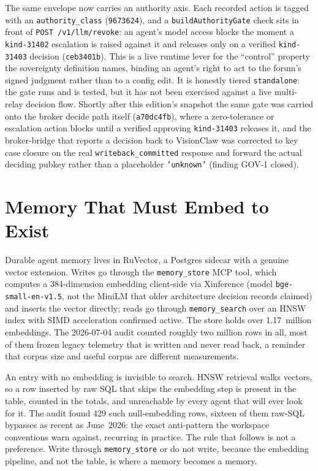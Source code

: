 The same envelope now carries an authority axis. Each recorded action is tagged with an \texttt{authority\_class} (\texttt{9673624}), and a
\texttt{buildAuthorityGate} check sits in front of \texttt{POST /v1/llm/revoke}: an agent's model access blocks the moment a \texttt{kind-31402} escalation is
raised against it and releases only on a verified \texttt{kind-31403} decision (\texttt{ceb3401b}). This is a live runtime lever for the ``control'' property the
sovereignty definition names, binding an agent's right to act to the forum's signed judgment rather than to a config edit. It is honestly tiered
\texttt{standalone}: the gate runs and is tested, but it has not been exercised against a live multi-relay decision flow. Shortly after this edition's
snapshot the same gate was carried onto the broker decide path itself (\texttt{a70dc4fb}), where a zero-tolerance or escalation action blocks until a verified
approving \texttt{kind-31403} releases it, and the broker-bridge that reports a decision back to VisionClaw was corrected to key case closure on the real
\texttt{writeback\_committed} response and forward the actual deciding pubkey rather than a placeholder \texttt{'unknown'} (finding GOV-1 closed).

\section{Memory That Must Embed to Exist}

Durable agent memory lives in RuVector, a Postgres sidecar with a genuine vector extension. Writes go through the \texttt{memory\_store} MCP tool, which
computes a 384-dimension embedding client-side via Xinference (model \texttt{bge-small-en-v1.5}, not the MiniLM that older architecture decision records
claimed) and inserts the vector directly; reads go through \texttt{memory\_search} over an HNSW index with SIMD acceleration confirmed active. The store holds
over 1.17~million embeddings. The 2026-07-04 audit counted roughly two million rows in all, most of them frozen legacy telemetry that is written and never read
back, a reminder that corpus size and useful corpus are different measurements.

\begin{keyinsight}[title={The pipeline is the contract}]
An entry with no embedding is invisible to search. HNSW retrieval walks vectors, so a row inserted by raw SQL that skips the embedding step is present in the
table, counted in the totals, and unreachable by every agent that will ever look for it. The audit found 429 such null-embedding rows, sixteen of them raw-SQL
bypasses as recent as June~2026: the exact anti-pattern the workspace conventions warn against, recurring in practice. The rule that follows is not a
preference. Write through \texttt{memory\_store} or do not write, because the embedding pipeline, and not the table, is where a memory becomes a memory.
\end{keyinsight}

